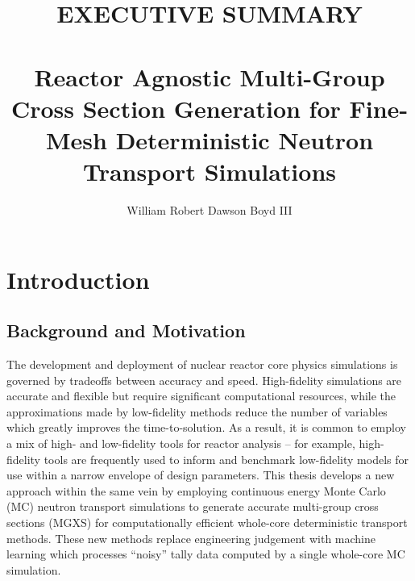 \documentclass[12pt,twoside]{mitthesis-exec}
\begin{document}



\title{EXECUTIVE SUMMARY \\~\\ Reactor Agnostic Multi-Group Cross Section Generation for Fine-Mesh Deterministic Neutron Transport Simulations}

\author{William Robert Dawson Boyd III}





\setcounter{savepage}{\thepage}



\singlespacing 

\section*{Introduction}

\subsection*{Background and Motivation}

The development and deployment of nuclear reactor core physics simulations is governed by tradeoffs between accuracy and speed. High-fidelity simulations are accurate and flexible but require significant computational resources, while the approximations made by low-fidelity methods reduce the number of variables which greatly improves the time-to-solution. As a result, it is common to employ a mix of high- and low-fidelity tools for reactor analysis -- for example, high-fidelity tools are frequently used to inform and benchmark low-fidelity models for use within a narrow envelope of design parameters. This thesis develops a new approach within the same vein by employing continuous energy Monte Carlo (MC) neutron transport simulations to generate accurate multi-group cross sections (MGXS) for computationally efficient whole-core deterministic transport methods. These new methods replace engineering judgement with machine learning which processes ``noisy'' tally data computed by a single whole-core MC simulation.
\end{document}
